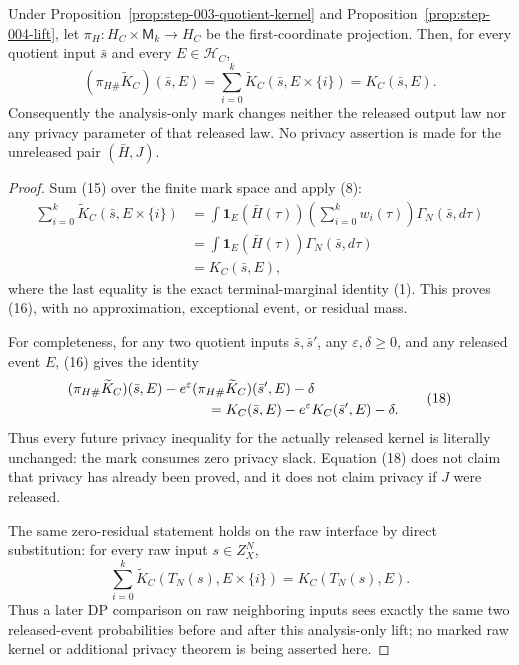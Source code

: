 \begin{proposition}\label{prop:step-004-projection}
Under Proposition~\ref{prop:step-003-quotient-kernel} and
Proposition~\ref{prop:step-004-lift}, let
\(\pi_H:H_C\times\mathsf M_k\to H_C\) be the first-coordinate projection.
Then, for every quotient input \(\bar s\) and every
\(E\in\mathcal H_C\),
\[
(\pi_{H\#}\widetilde K_C)(\bar s,E)
=\sum_{i=0}^k
  \widetilde K_C(\bar s,E\times\{i\})
=K_C(\bar s,E).
\tag{16}
\]
Consequently the analysis-only mark changes neither the released output law
nor any privacy parameter of that released law. No privacy assertion is made
for the unreleased pair \((\bar H,J)\).


\end{proposition}

\begin{proof}
Sum (15) over the finite mark space and apply (8):
\[
\begin{aligned}
\sum_{i=0}^k
\widetilde K_C(\bar s,E\times\{i\})
&=\int
\mathbf1_E(\bar H(\tau))
\left(\sum_{i=0}^k w_i(\tau)\right)
\Gamma_N(\bar s,d\tau)\\
&=\int\mathbf1_E(\bar H(\tau))
\Gamma_N(\bar s,d\tau)\\
&=K_C(\bar s,E),
\end{aligned}
\tag{17}
\]
where the last equality is the exact terminal-marginal identity (1). This
proves (16), with no approximation, exceptional event, or residual mass.

For completeness, for any two quotient inputs \(\bar s,\bar s'\), any
\(\varepsilon,\delta\geq0\), and any released event \(E\), (16) gives the
identity
\[
\begin{aligned}
&(\pi_{H\#}\widetilde K_C)(\bar s,E)
-e^\varepsilon(\pi_{H\#}\widetilde K_C)(\bar s',E)-\delta\\
&\hspace{35mm}=
K_C(\bar s,E)-e^\varepsilon K_C(\bar s',E)-\delta.
\end{aligned}
\tag{18}
\]
Thus every future privacy inequality for the actually released kernel is
literally unchanged: the mark consumes zero privacy slack. Equation (18)
does not claim that privacy has already been proved, and it does not claim
privacy if \(J\) were released.

The same zero-residual statement holds on the raw interface by direct
substitution: for every raw input \(s\in Z_X^N\),
\[
\sum_{i=0}^k
\widetilde K_C(T_N(s),E\times\{i\})
=K_C(T_N(s),E).
\tag{19}
\]
Thus a later DP comparison on raw neighboring inputs sees exactly the same
two released-event probabilities before and after this analysis-only lift;
no marked raw kernel or additional privacy theorem is being asserted here.


\end{proof}
